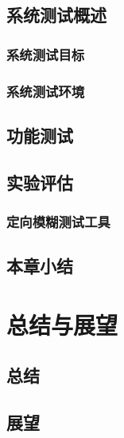 \documentclass[bachelor]{njupthesis}
\begin{document}
\section{系统测试概述}
\subsection{系统测试目标}
\subsection{系统测试环境}
\section{功能测试}
\section{实验评估}
\subsection{定向模糊测试工具}
\section{本章小结}


\chapter{总结与展望}
\section{总结}
\section{展望}



			
\end{document}
